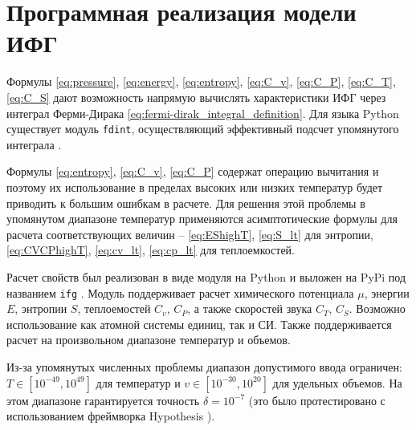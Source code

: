 \section{Программная реализация модели ИФГ}
Формулы \eqref{eq:pressure}, \eqref{eq:energy}, \eqref{eq:entropy}, \eqref{eq:C_v}, \eqref{eq:C_P}, \eqref{eq:C_T}, \eqref{eq:C_S} дают возможность напрямую вычислять характеристики ИФГ через интеграл Ферми-Дирака \eqref{eq:fermi-dirak_integral_definition}.
Для языка Python существует модуль \texttt{fdint}, осуществляющий эффективный подсчет упомянутого интеграла \cite{fdint}.

Формулы \eqref{eq:entropy}, \eqref{eq:C_v}, \eqref{eq:C_P} содержат операцию вычитания и поэтому их использование в пределах высоких или низких температур будет приводить к большим ошибкам в расчете.
Для решения этой проблемы в упомянутом диапазоне температур применяются асимптотические формулы для расчета соответствующих величин -- \eqref{eq:EShighT}, \eqref{eq:S_lt} для энтропии, \eqref{eq:CVCPhighT}, \eqref{eq:cv_lt}, \eqref{eq:cp_lt} для теплоемкостей.

Расчет свойств был реализован в виде модуля на Python и выложен на PyPi под названием \texttt{ifg} \cite{ifgpy}.
Модуль поддерживает расчет химического потенциала $\mu$, энергии $E$, энтропии $S$, теплоемостей $C_v$, $C_P$, а также скоростей звука $C_T$, $C_S$.
Возможно использование как атомной системы единиц, так и СИ.
Также поддерживается расчет на произвольном диапазоне температур и объемов.

Из-за упомянутых численных проблемы диапазон допустимого ввода ограничен: $T \in [10^{-49}, 10^{49}]$ для температур и $v \in [10^{-30}, 10^{20}]$ для удельных объемов.
На этом диапазоне гарантируется точность $\delta = 10^{-7}$ (это было протестировано с использованием фреймворка Hypothesis \cite{MacIver2019Hypothesis}).



